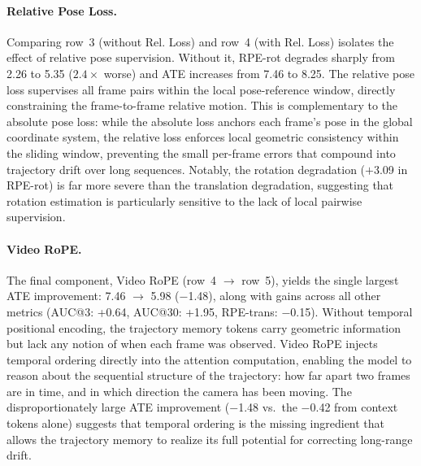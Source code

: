 \paragraph{Relative Pose Loss.}
Comparing row~3 (without Rel. Loss) and row~4 (with Rel. Loss)
isolates the effect of relative pose supervision.
Without it, RPE-rot degrades sharply from 2.26 to 5.35
($2.4\times$ worse) and ATE increases from 7.46 to 8.25.
The relative pose loss supervises all frame pairs within the local
pose-reference window, directly constraining the frame-to-frame
relative motion.
This is complementary to the absolute pose loss: while the absolute
loss anchors each frame's pose in the global coordinate system,
the relative loss enforces local geometric consistency within the
sliding window, preventing the small per-frame errors that
compound into trajectory drift over long sequences.
Notably, the rotation degradation ($+$3.09 in RPE-rot) is far more
severe than the translation degradation, suggesting that rotation
estimation is particularly sensitive to the lack of local
pairwise supervision.

\paragraph{Video RoPE.}
The final component, Video RoPE (row~4 $\to$ row~5), yields the
single largest ATE improvement: 7.46 $\to$ 5.98 ($-$1.48), along
with gains across all other metrics (AUC@3: +0.64, AUC@30: +1.95,
RPE-trans: $-$0.15).
Without temporal positional encoding, the trajectory memory tokens
carry geometric information but lack any notion of when each frame
was observed.
Video RoPE injects temporal ordering directly into the attention
computation, enabling the model to reason about the sequential
structure of the trajectory: how far apart two frames are in time,
and in which direction the camera has been moving.
The disproportionately large ATE improvement ($-$1.48 vs.\ the
$-$0.42 from context tokens alone) suggests that temporal ordering
is the missing ingredient that allows the trajectory memory to
realize its full potential for correcting long-range drift.



